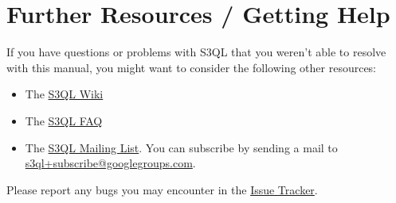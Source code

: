 \documentclass[letterpaper,10pt,english]{sphinxmanual}
\begin{document}
\chapter{Further Resources / Getting Help}
\label{resources::doc}\label{resources:further-resources-getting-help}\label{resources:resources}
If you have questions or problems with S3QL that you weren't able to
resolve with this manual, you might want to consider the following other resources:
\begin{itemize}
\item {} 
The \href{http://code.google.com/p/s3ql/w/list}{S3QL Wiki}

\item {} 
The \href{http://code.google.com/p/s3ql/wiki/FAQ}{S3QL FAQ}

\item {} 
The \href{http://groups.google.com/group/s3ql}{S3QL Mailing List}. You
can subscribe by sending a mail to
\href{mailto:s3ql+subscribe@googlegroups.com}{s3ql+subscribe@googlegroups.com}.

\end{itemize}

Please report any bugs you may encounter in the \href{http://code.google.com/p/s3ql/issues/list}{Issue Tracker}.



\renewcommand{\indexname}{Index}
\printindex
\end{document}
